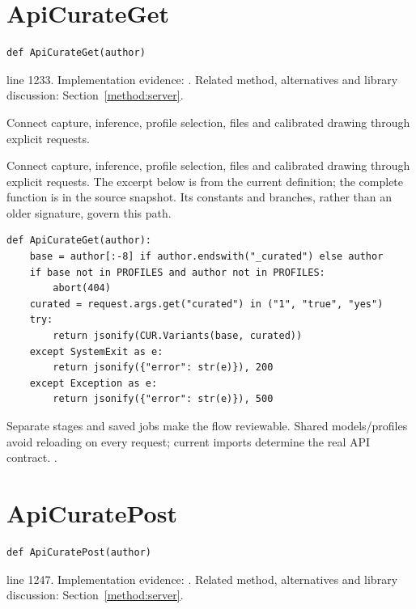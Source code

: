 \section{ApiCurateGet}\label{fn:web-server:ApiCurateGet}
\begin{lstlisting}[style=sig]
def ApiCurateGet(author)
\end{lstlisting}
 line 1233. Implementation evidence: \cite{code2026}. Related method, alternatives and library discussion: Section~\ref{method:server}.


Connect capture, inference, profile selection, files and calibrated drawing through explicit requests.


Connect capture, inference, profile selection, files and calibrated drawing through explicit requests. The excerpt below is from the current definition; the complete function is in the source snapshot. Its constants and branches, rather than an older signature, govern this path.


\begin{lstlisting}[style=plain]
def ApiCurateGet(author):
    base = author[:-8] if author.endswith("_curated") else author
    if base not in PROFILES and author not in PROFILES:
        abort(404)
    curated = request.args.get("curated") in ("1", "true", "yes")
    try:
        return jsonify(CUR.Variants(base, curated))
    except SystemExit as e:
        return jsonify({"error": str(e)}), 200
    except Exception as e:
        return jsonify({"error": str(e)}), 500
\end{lstlisting}
Separate stages and saved jobs make the flow reviewable. Shared models/profiles avoid reloading on every request; current imports determine the real API contract. \cite{flaskdocs,pillowops,code2026}.


\section{ApiCuratePost}\label{fn:web-server:ApiCuratePost}
\begin{lstlisting}[style=sig]
def ApiCuratePost(author)
\end{lstlisting}
 line 1247. Implementation evidence: \cite{code2026}. Related method, alternatives and library discussion: Section~\ref{method:server}.


